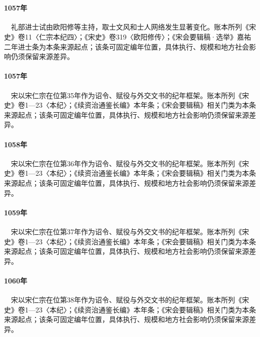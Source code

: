 \section{}

\paragraph{1057年}　礼部进士试由欧阳修等主持，取士文风和士人网络发生显著变化。账本所列《宋史》卷11〈仁宗本纪四〉；《宋史》卷319〈欧阳修传〉；《宋会要辑稿·选举》嘉祐二年进士条为本条来源起点；该条可固定编年位置，具体执行、规模和地方社会影响仍须保留来源差异。

\paragraph{1057年}　宋以宋仁宗在位第35年作为诏令、赋役与外交文书的纪年框架。账本所列《宋史》卷1—23〈本纪〉；《续资治通鉴长编》本年条；《宋会要辑稿》相关门类为本条来源起点；该条可固定编年位置，具体执行、规模和地方社会影响仍须保留来源差异。

\paragraph{1058年}　宋以宋仁宗在位第36年作为诏令、赋役与外交文书的纪年框架。账本所列《宋史》卷1—23〈本纪〉；《续资治通鉴长编》本年条；《宋会要辑稿》相关门类为本条来源起点；该条可固定编年位置，具体执行、规模和地方社会影响仍须保留来源差异。

\paragraph{1059年}　宋以宋仁宗在位第37年作为诏令、赋役与外交文书的纪年框架。账本所列《宋史》卷1—23〈本纪〉；《续资治通鉴长编》本年条；《宋会要辑稿》相关门类为本条来源起点；该条可固定编年位置，具体执行、规模和地方社会影响仍须保留来源差异。

\paragraph{1060年}　宋以宋仁宗在位第38年作为诏令、赋役与外交文书的纪年框架。账本所列《宋史》卷1—23〈本纪〉；《续资治通鉴长编》本年条；《宋会要辑稿》相关门类为本条来源起点；该条可固定编年位置，具体执行、规模和地方社会影响仍须保留来源差异。

